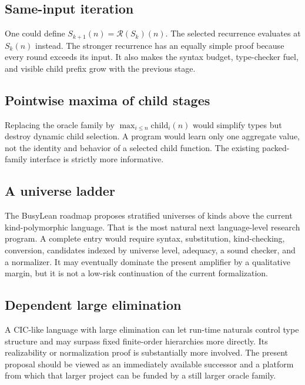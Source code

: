 \documentclass[11pt]{article}
\theoremstyle{definition}
\theoremstyle{remark}
\newcommand{\Round}{\mathcal R}
\begin{document}
\subsection{Same-input iteration}

One could define
$S_{k+1}(n)=\Round(S_k)(n)$. The selected recurrence evaluates at $S_k(n)$
instead. The stronger recurrence has an equally simple proof because every
round exceeds its input. It also makes the syntax budget, type-checker fuel, and
visible child prefix grow with the previous stage.

\subsection{Pointwise maxima of child stages}

Replacing the oracle family by
$\max_{i\le n}\mathrm{child}_i(n)$ would simplify types but destroy dynamic
child selection. A program would learn only one aggregate value, not the
identity and behavior of a selected child function. The existing packed-family
interface is strictly more informative.

\subsection{A universe ladder}

The BusyLean roadmap proposes stratified universes of kinds above the current
kind-polymorphic language. That is the most natural next language-level
research program. A complete entry would require syntax, substitution,
kind-checking, conversion, candidates indexed by universe level, adequacy, a
sound checker, and a normalizer. It may eventually dominate the present
amplifier by a qualitative margin, but it is not a low-risk continuation of the
current formalization.

\subsection{Dependent large elimination}

A CIC-like language with large elimination can let run-time naturals control
type structure and may surpass fixed finite-order hierarchies more directly.
Its realizability or normalization proof is substantially more involved. The
present proposal should be viewed as an immediately available successor and a
platform from which that larger project can be funded by a still larger oracle
family.

\end{document}
